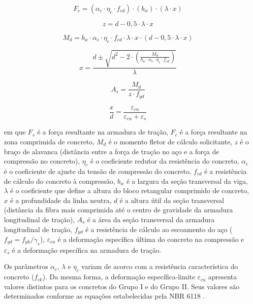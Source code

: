 \begin{equation}
    F_c = (\alpha_c \cdot \eta_c \cdot f_{cd}) \cdot (b_w) \cdot (\lambda \cdot x)
\end{equation}

\begin{equation}
    z = d - 0{,}5 \cdot \lambda \cdot x
\end{equation}

\begin{equation}
    M_d = b_w \cdot \alpha_c \cdot \eta_c \cdot f_{cd} \cdot \lambda \cdot x \cdot (d - 0{,}5 \cdot \lambda \cdot x)
\end{equation}

\begin{equation}
    x = \frac{d \pm \sqrt{d^2 - 2 \cdot \left(\frac{M_d}{b_w \cdot \alpha_c \cdot \eta_c \cdot f_{cd}}\right)}}{\lambda}
\end{equation}

\begin{equation}
    A_s = \frac{M_d}{z \cdot f_{yd}}
\end{equation}

\begin{equation}
    \frac{x}{d} = \frac{\varepsilon_{cu}}{\varepsilon_{cu} + \varepsilon_s}
\end{equation}

em que $F_s$ é a força resultante na armadura de tração, $F_c$ é a força resultante na zona comprimida de concreto, $M_d$ é o momento fletor de cálculo solicitante, $z$ é o braço de alavanca (distância entre a força de tração no aço e a força de compressão no concreto), \(\eta_c\) é o coeficiente redutor da resistência do concreto, \(\alpha_c\) é o coeficiente de ajuste da tensão de compressão do concreto, $f_{cd}$ é a resistência de cálculo do concreto à compressão, $b_w$ é a largura da seção transversal da viga, $\lambda$ é o coeficiente que define a altura do bloco retangular comprimido de concreto, $x$ é a profundidade da linha neutra, $d$ é a altura útil da seção transversal (distância da fibra mais comprimida até o centro de gravidade da armadura longitudinal de tração), $A_s$ é a área da seção transversal da armadura longitudinal de tração, $f_{yd}$ é a resistência de cálculo ao escoamento do aço ($f_{yd} = f_{yk} / \gamma_s$), $\varepsilon_{cu}$ é a deformação específica última do concreto na compressão e $\varepsilon_s$ é a deformação específica na armadura de tração.

Os parâmetros $\alpha_c$, $\lambda$ e $\eta_c$ variam de acorco com a resistência característica do concreto ($f_{ck}$). Da mesma forma, a deformação específica-limite $\varepsilon_{cu}$ apresenta valores distintos para os concretos do Grupo I e do Grupo II. Seus valores são determinados conforme as equações estabelecidas pela NBR 6118 .


